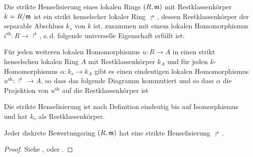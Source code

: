 \documentclass[german, bibliography=totoc]{scrreprt}
\renewcommand*{\optcite}[2][]{}
\begin{document}

\begin{Definition}\label{def:striktehenselisierung}
  Die strikte Henselisierung eines lokalen Rings $(R,\mathfrak{m})$ mit
  Restklassenkörper $k=R/\mathfrak{m}$ ist ein strikt henselscher lokaler Ring
  $\Rsh$, dessen Restklassenkörper der separable Abschluss $k_s$ von
  $k$ ist, zusammen mit einem lokalen Homomorphismus
  $i^\text{sh}\colon R\to\Rsh$, s.\,d. folgende universelle
  Eigenschaft erfüllt ist:
  
  Für jeden weiteren lokalen Homomorphismus $u\colon R\to A$ in einen
  strikt henselschen lokalen Ring $A$ mit Restklassenkörper $k_A$ und
  für jeden $k$-Homomorphismus $\alpha\colon k_s\to k_A$ gibt es einen
  eindeutigen lokalen Homomorphismus $u^\text{sh}\colon\Rsh\to A$, so
  dass das folgende Diagramm kommutiert und so dass $\alpha$ die
  Projektion von $u^\text{sh}$ auf die Restklassenkörper ist
  \begin{center}
  \end{center}

  Die strikte Henselisierung ist nach Definition eindeutig bis auf
  Isomorphismus und hat $k_s$ als Restklassenkörper.
\end{Definition}

\begin{Satz}
  \label{thm:exhenselisierung}
  Jeder diskrete Bewertungsring $(R,\mathfrak{m})$ hat eine
  strikte Henselisierung $\Rsh$.
  \begin{proof}
    Siehe
    \cite[Proposition IV.6.5]{silverman2},
    \cite[Remark IV.6.6.2]{silverman2}
    oder \cite[Chapter 2.3, S. 48]{neron}.
  \end{proof}
\end{Satz}
\end{document}
